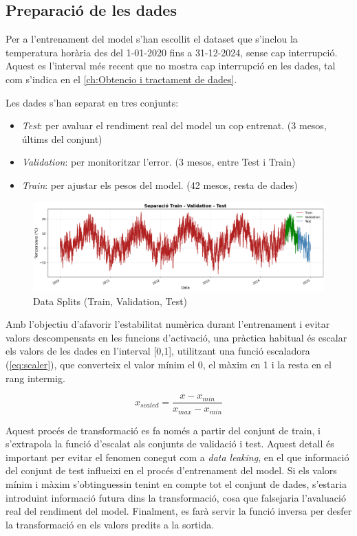 \documentclass[../main.tex]{subfiles}
\begin{document}
\subsection{Preparació de les dades}

Per a l'entrenament del model s'han escollit el dataset que s'inclou la temperatura horària des del 1-01-2020 fins a 31-12-2024, sense cap interrupció. Aquest es l'interval més recent que no mostra cap interrupció en les dades, tal com s'indica en el \cref{ch:Obtencio i tractament de dades}.

Les dades s'han separat en tres conjunts: 
\begin{itemize}
\item \textit{Test}: per avaluar el rendiment real del model un cop entrenat.  (3 mesos, últims del conjunt)
\item  \textit{Validation}: per monitoritzar l’error. (3 mesos, entre Test i Train)
\item  \textit{Train}: per ajustar els pesos del model. (42 mesos, resta de dades)
\end{itemize}


\begin{figure}[H]
    \centering
    \includegraphics[width=1\linewidth]{figures/lstm/data/data_splits_plot.png}
    \caption{Data Splits (Train, Validation, Test)}
    \label{fig:split_data_plot}
\end{figure}

Amb l’objectiu d’afavorir l’estabilitat numèrica durant l’entrenament i evitar valors descompensats en les funcions d’activació, una pràctica habitual és escalar els valors de les dades en l'interval [0,1], utilitzant una funció escaladora (\cref{eq:scaler}), que converteix el valor mínim el 0, el màxim en 1 i la resta en el rang intermig.
    
\begin{equation}
        x_{scaled} = \dfrac{x - x_{min}}{x_{max} - x_{min}}
        \label{eq:scaler}
    \end{equation}

Aquest procés de transformació es fa només a partir del conjunt de train, i s’extrapola la funció d’escalat als conjunts de validació i test. Aquest detall és important per evitar el fenomen conegut com a \textit{data leaking}, en el que informació del conjunt de test influeixi en el procés d’entrenament del model. Si els valors mínim i màxim s’obtinguessin tenint en compte tot el conjunt de dades, s’estaria introduint informació futura dins la transformació, cosa que falsejaria l’avaluació real del rendiment del model. Finalment, es farà servir la funció inversa per desfer la transformació en els valors predits a la sortida.
\end{document}
